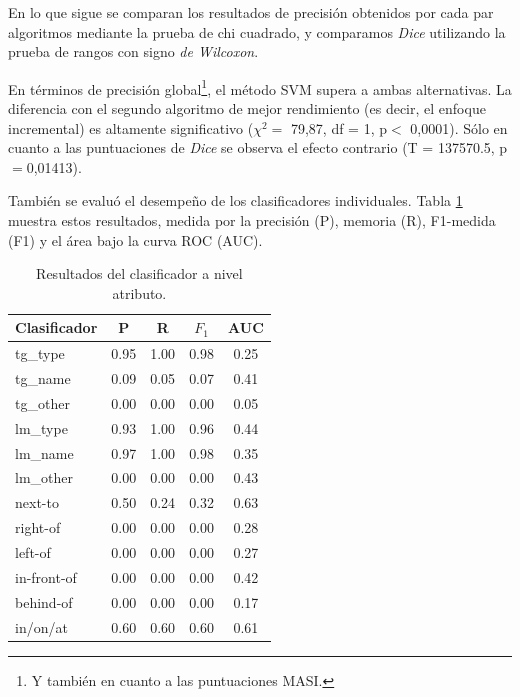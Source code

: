 

En lo que sigue se comparan los resultados de precisi\'on obtenidos por cada par algoritmos mediante la prueba de chi cuadrado, y comparamos {\em Dice} utilizando la prueba de rangos con signo {\em de Wilcoxon}.

En t\'erminos de precisi\'on global\footnote{Y tambi\'en en cuanto a las puntuaciones MASI.}, el m\'etodo SVM supera a ambas alternativas. La diferencia con el segundo algoritmo de mejor rendimiento (es decir, el enfoque incremental) es altamente significativo ($\chi^{2}=$ 79,87, df = 1, p$<$ 0,0001). S\'olo en cuanto a las puntuaciones de {\it Dice} se observa el efecto contrario (T = 137570.5, p$=$0,01413).

Tambi\'en se evalu\'o el desempe\~no de los clasificadores individuales. Tabla \ref{tab-svm-results} muestra estos resultados, medida por la precisi\'on (P), memoria (R), F1-medida (F1) y el \'area bajo la curva ROC (AUC).

\begin{table}[H]
\begin{center}
\footnotesize{

\begin{tabular}{l c c c c }
\hline
{{Clasificador}}	& {P} & {R} & {$F_{1}$} & {AUC} \\
\hline
{{tg\_type}} 			& 0.95 & 1.00 & 0.98 & 0.25 \\
{{tg\_name}}			& 0.09 & 0.05 & 0.07 & 0.41 \\
{{tg\_other}}			& 0.00 & 0.00 & 0.00 & 0.05 \\                               
{{lm\_type}}			& 0.93 & 1.00 & 0.96 & 0.44 \\                               
{{lm\_name}}			& 0.97 & 1.00 & 0.98 & 0.35 \\                               
{{lm\_other}}			& 0.00 & 0.00 & 0.00 & 0.43 \\                               
{{next-to}}				& 0.50 & 0.24 & 0.32 & 0.63 \\                               
{{right-of}}			& 0.00 & 0.00 & 0.00 & 0.28 \\                               
{{left-of}}				& 0.00 & 0.00 & 0.00 & 0.27 \\                               
{{in-front-of}}		& 0.00 & 0.00 & 0.00 & 0.42 \\                               
{{behind-of}}			& 0.00 & 0.00 & 0.00 & 0.17 \\                               
{{in/on/at}} 			& 0.60 & 0.60 & 0.60 & 0.61 \\                               
\hline                   
\end{tabular}
\caption{Resultados del clasificador a nivel atributo.}
\label{tab-svm-results}
}
\end{center}
\end{table}
\normalsize

